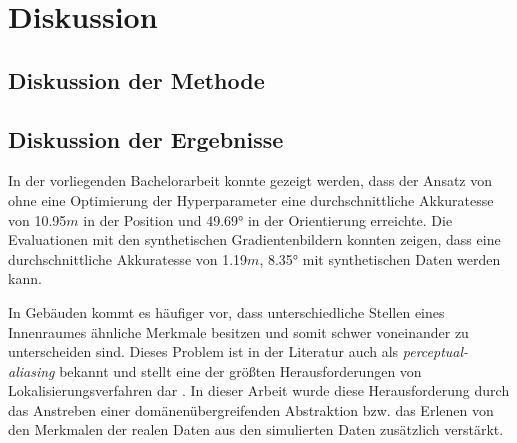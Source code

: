 
\section{Diskussion}
\label{sec:kapitel_5}

\subsection{Diskussion der Methode}
\subsection{Diskussion der Ergebnisse}



In der vorliegenden Bachelorarbeit konnte gezeigt werden, dass der Ansatz von \citet{acharyaBIMPoseNetIndoorCamera2019} ohne eine Optimierung der Hyperparameter eine durchschnittliche Akkuratesse von 10.95$m$ in der Position und 49.69° in der Orientierung erreichte. Die Evaluationen mit den synthetischen Gradientenbildern konnten zeigen, dass eine durchschnittliche Akkuratesse von 1.19$m$, 8.35° mit synthetischen Daten werden kann.

In Gebäuden kommt es häufiger vor, dass unterschiedliche Stellen eines Innenraumes ähnliche Merkmale besitzen und somit schwer voneinander zu unterscheiden sind. Dieses Problem ist in der Literatur auch als \textit{perceptual-aliasing} bekannt und stellt eine der größten Herausforderungen von Lokalisierungsverfahren dar \cite{lowryVisualPlaceRecognition2016}. In dieser Arbeit wurde diese Herausforderung durch das Anstreben einer domänenübergreifenden Abstraktion bzw. das Erlenen von den Merkmalen der realen Daten aus den simulierten Daten zusätzlich verstärkt.



